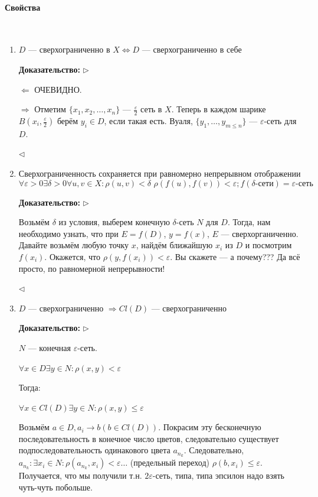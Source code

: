 \documentclass{article}
\def\dbl{\,\,}
\let\vanillaparagraph\paragraph
\renewcommand{\paragraph}[1]{\vanillaparagraph{#1}\mbox{}\\}
\begin{document}
\paragraph{Свойства}

\begin{enumerate}
    \item $D\text{ --- сверхограниченно в }X \Leftrightarrow D\text{ --- сверхограниченно в себе}$
    
    \textbf{Доказательство:}
    $\rhd$
    
    $\Leftarrow$ ОЧЕВИДНО.
    
    $\Rightarrow$ Отметим $\{x_1, x_2, \ldots, x_n\} $ --- $ \frac{\varepsilon}{2}$ сеть в $X$. Теперь в каждом шарике $B(x_i, \frac{\varepsilon}{2})$ берём $y_i \in D$, если такая есть. Вуаля, $\{y_1, \ldots, y_{m \le n}\}$ --- $\varepsilon$-сеть для $D$.
    
    $\lhd$

    \item $\text{Сверхограниченность сохраняется при равномерно непрерывном отображении}$ \[\forall \varepsilon > 0 \exists \delta > 0 \forall u, v \in X: \rho(u, v) < \delta \dbl \rho(f(u), f(v)) < \varepsilon; f(\delta\text{-сети}) = \varepsilon\textit{-сеть}\]
    
    \textbf{Доказательство:}
    $\rhd$
    
    Возьмём $\delta$ из условия, выберем конечную $\delta$-сеть $N$ для $D$. Тогда, нам необходимо узнать, что при $E = f(D)$, $y = f(x)$, $E$ --- сверхорганиченно. Давайте возьмём любую точку $x$, найдём ближайшую $x_i$ из $D$ и посмотрим $f(x_i)$. Окажется, что $\rho(y, f(x_i)) < \varepsilon$. Вы скажете --- а почему??? Да всё просто, по равномерной непрерывности!
    
    $\lhd$

    
    \item $D\text{ --- сверхограниченно }\Rightarrow Cl(D)\text{ --- сверхограниченно}$
    
    \textbf{Доказательство:}
    $\rhd$
    
    $N$ --- конечная $\varepsilon$-сеть.
    
    $\forall x \in D \exists y \in N : \rho(x, y) < \varepsilon$
    
    Тогда:
    
    $\forall x \in Cl(D) \exists y \in N : \rho(x, y) \le \varepsilon$
    
    Возьмём $a \in D, a_i \rightarrow b (b \in Cl(D))$. Покрасим эту бесконечную последовательность в конечное число цветов, следовательно существует подпоследовательность одинакового цвета $a_{n_k}$. Следовательно, $a_{n_k} : \exists x_i \in N : \rho(a_{n_k}, x_i) < \varepsilon \ldots$ (предельный переход) $\rho(b, x_i) \le \varepsilon$. Получается, что мы получили т.н. $2\varepsilon$-сеть, типа, типа эпсилон надо взять чуть-чуть побольше.
    

\end{enumerate}
\end{document}
